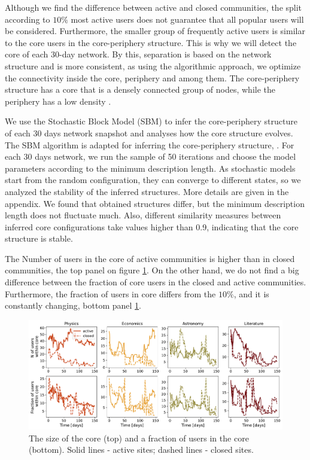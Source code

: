 Although we find the difference between active and closed communities, the split according to $10\%$  most active users does not guarantee that all popular users will be considered. Furthermore, the smaller group of frequently active users is similar to the core users in the core-periphery structure. This is why we will detect the core of each 30-day network. By this, separation is based on the network structure and is more consistent, as using the algorithmic approach, we optimize the connectivity inside the core, periphery and among them. The core-periphery structure has a core that is a densely connected group of nodes, while the periphery has a low density \cite{fortunato2010community, gallagher2020clarified}. 

We use the Stochastic Block Model (SBM) to infer the core-periphery structure of each 30 days network snapshot and analyses how the core structure evolves. The  SBM algorithm is adapted for inferring the core-periphery structure, \cite{gallagher2020clarified}. For each 30 days network, we run the sample of 50 iterations and choose the model parameters according to the minimum description length. As stochastic models start from the random configuration, they can converge to different states, so we analyzed the stability of the inferred structures. More details are given in the appendix. We found that obtained structures differ, but the minimum description length does not fluctuate much. Also, different similarity measures between inferred core configurations take values higher than 0.9, indicating that the core structure is stable. 

The Number of users in the core of active communities is higher than in closed communities, the top panel on figure \ref{fig:core_size}. On the other hand, we do not find a big difference between the fraction of core users in the closed and active communities. Furthermore, the fraction of users in core differs from the $10\%$, and it is constantly changing, bottom panel \ref{fig:core_size}. 

\begin{figure}[h!]
	\centering
	\includegraphics[width=\linewidth]{figures/stackexchange/core_users.pdf}
	\caption[The size of the core]{The size of the core (top) and a fraction of users in the core (bottom). Solid lines - active sites; dashed lines - closed sites.}
	\label{fig:core_size}
\end{figure}

